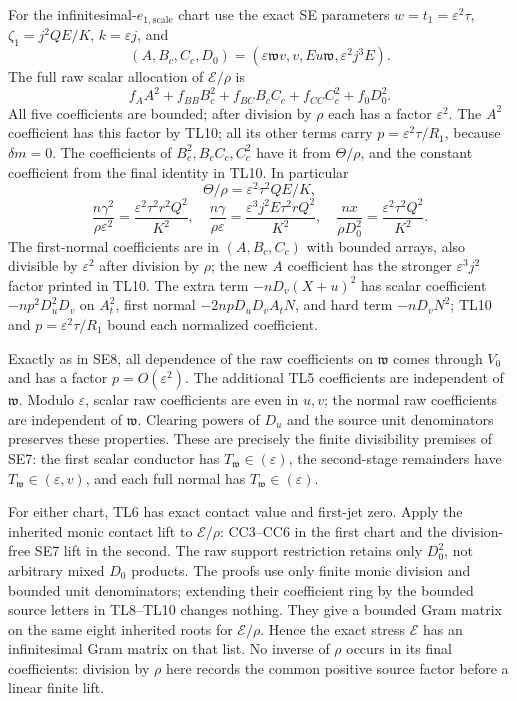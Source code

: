For the infinitesimal-$e_{1,\mathrm{scale}}$ chart use the exact SE
parameters $w=t_1=\varepsilon^2\tau$,
$\zeta_1=j^2QE/K$, $k=\varepsilon j$, and
\[
 (A,B_c,C_c,D_0)
 =(\varepsilon\mathfrak wv,v,Eu\mathfrak w,\varepsilon^2j^3E).
\]
The full raw scalar allocation of $\mathscr E/\rho$ is
\[
 f_AA^2+f_{BB}B_c^2+f_{BC}B_cC_c+f_{CC}C_c^2+f_0D_0^2.
\tag{TL9}
\]
All five coefficients are bounded; after division by $\rho$ each has a
factor $\varepsilon^2$. The $A^2$ coefficient has this factor by TL10;
all its other terms carry $p=\varepsilon^2\tau/R_1$, because
$\delta m=0$. The coefficients of $B_c^2,B_cC_c,C_c^2$ have it
from $\Theta/\rho$, and the constant coefficient from the final
identity in TL10. In particular
\[
 \Theta/\rho=\varepsilon^2\tau^2QE/K,
\]
\[
 \frac{n\gamma^2}{\rho\varepsilon^2}
 =\frac{\varepsilon^2\tau^2r^2Q^2}{K^2},\quad
 \frac{n\gamma}{\rho\varepsilon}
 =\frac{\varepsilon^3j^2E\tau^2rQ^2}{K^2},\quad
 \frac{nx}{\rho D_0^2}
 =\frac{\varepsilon^2\tau^2Q^2}{K^2}.
\tag{TL10}
\]
The first-normal coefficients are in $(A,B_c,C_c)$ with bounded
arrays, also divisible by $\varepsilon^2$ after division by $\rho$;
the new $A$ coefficient has the stronger $\varepsilon^3j^2$ factor
printed in TL10. The extra term $-nD_v(X+u)^2$ has scalar coefficient
$-np^2D_u^2D_v$ on $A_t^2$, first normal
$-2npD_uD_vA_tN$, and hard term $-nD_vN^2$; TL10 and
$p=\varepsilon^2\tau/R_1$ bound each normalized coefficient.

Exactly as in SE8, all dependence of the raw coefficients on
$\mathfrak w$ comes through $V_0$ and has a factor
$p=O(\varepsilon^2)$. The additional TL5 coefficients are independent
of $\mathfrak w$. Modulo $\varepsilon$, scalar raw coefficients are
even in $u,v$; the normal raw coefficients are independent of
$\mathfrak w$. Clearing powers of $D_u$ and the source unit
denominators preserves these properties. These are precisely the
finite divisibility premises of SE7: the first scalar conductor has
$T_{\mathfrak w}\in(\varepsilon)$, the second-stage remainders have
$T_{\mathfrak w}\in(\varepsilon,v)$, and each full normal has
$T_{\mathfrak w}\in(\varepsilon)$.

For either chart, TL6 has exact contact value and first-jet zero.
Apply the inherited monic contact lift to $\mathscr E/\rho$:
CC3--CC6 in the first chart and the division-free SE7 lift in the
second. The raw support restriction retains only $D_0^2$, not arbitrary
mixed $D_0$ products. The proofs use only finite monic division and
bounded unit denominators; extending their coefficient ring by the
bounded source letters in TL8--TL10 changes nothing. They give a
bounded Gram matrix on the same eight inherited roots for
$\mathscr E/\rho$. Hence the exact stress $\mathscr E$ has an
infinitesimal Gram matrix on that list. No inverse of $\rho$ occurs in
its final coefficients: division by $\rho$ here records the common
positive source factor before a linear finite lift.

